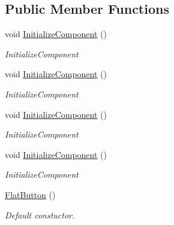 \subsection*{Public Member Functions}
\begin{DoxyCompactItemize}
\item 
void \mbox{\hyperlink{class_wpf_handler_1_1_u_i_1_1_controls_1_1_flat_button_acabdb68bfd2ca1a7baf68aeb819a7721}{Initialize\+Component}} ()
\begin{DoxyCompactList}\small\item\em Initialize\+Component \end{DoxyCompactList}\item 
void \mbox{\hyperlink{class_wpf_handler_1_1_u_i_1_1_controls_1_1_flat_button_acabdb68bfd2ca1a7baf68aeb819a7721}{Initialize\+Component}} ()
\begin{DoxyCompactList}\small\item\em Initialize\+Component \end{DoxyCompactList}\item 
void \mbox{\hyperlink{class_wpf_handler_1_1_u_i_1_1_controls_1_1_flat_button_acabdb68bfd2ca1a7baf68aeb819a7721}{Initialize\+Component}} ()
\begin{DoxyCompactList}\small\item\em Initialize\+Component \end{DoxyCompactList}\item 
void \mbox{\hyperlink{class_wpf_handler_1_1_u_i_1_1_controls_1_1_flat_button_acabdb68bfd2ca1a7baf68aeb819a7721}{Initialize\+Component}} ()
\begin{DoxyCompactList}\small\item\em Initialize\+Component \end{DoxyCompactList}\item 
\mbox{\hyperlink{class_wpf_handler_1_1_u_i_1_1_controls_1_1_flat_button_a17b78f2f94dad89be055e7bd3eec09da}{Flat\+Button}} ()
\begin{DoxyCompactList}\small\item\em Default constuctor. \end{DoxyCompactList}\end{DoxyCompactItemize}
